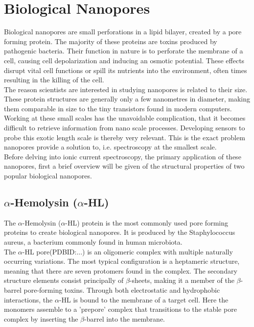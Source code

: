 \section{Biological Nanopores}

Biological nanopores are small perforations in a lipid bilayer, created
by a pore forming protein.  The majority of these proteins are toxins produced by
pathogenic bacteria. Their function in nature is to perforate the membrane of a cell,
causing cell depolarization and inducing an osmotic potential. These effects disrupt
vital cell functions or spill its nutrients into the environment, often times resulting
in the killing of the cell.\\

The reason scientists are interested in studying nanopores is related to their size.
These protein structures are generally only a few nanometres in diameter, making them
comparable in size to the tiny transistors found in modern computers.
Working at these small scales has the unavoidable complication, that it becomes difficult
to retrieve information from nano scale processes.
Developing sensors to probe this exotic length scale is thereby very relevant. This is
the exact problem nanopores provide a solution to, i.e. spectroscopy at the smallest
scale.\\

Before delving into ionic current spectroscopy, the primary application of these
nanopores, first a brief overview will be given of the structural properties of two
popular biological nanopores.

\subsection{$\alpha$-Hemolysin ($\alpha$-HL)}

The $\alpha$-Hemolysin ($\alpha$-HL) protein is the most commonly used pore forming
proteins to create biological nanopores. It is produced by the Staphylococcus aureus, a
bacterium commonly found in human microbiota.\\

The $\alpha$-HL pore(PDBID:...) is an oligomeric complex with multiple naturally
occurring variations. The most typical configuration
is a heptameric structure, meaning that there are seven protomers found in the complex.
The secondary structure elements consist principally of $\beta$-sheets, making it a
member
of the $\beta$-barrel pore-forming toxins. Through both electrostatic and hydrophobic
interactions, the $\alpha$-HL is bound to the membrane of a target cell. Here the
monomers assemble to a 'prepore' complex that transitions to the stable pore complex by
inserting the $\beta$-barrel into the membrane.\\

